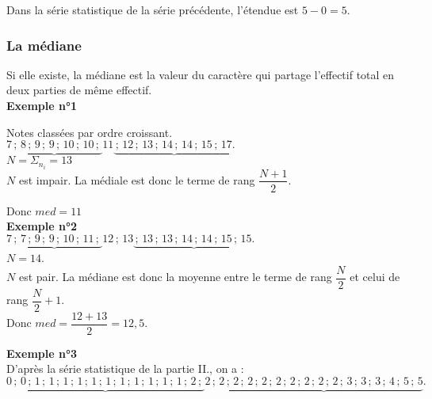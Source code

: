 Dans la série statistique de la série précédente, l'étendue est $5 - 0 = 5$.

\subsubsection{La médiane}

Si elle existe, la médiane est la valeur du caractère qui partage l'effectif total en deux parties de même effectif. \\

\textbf{Exemple n°1}

Notes classées par ordre croissant. \\

$ \underbrace{ 7 \, ; \,  8 \, ; \,  9 \, ; \,  9 \, ; \,  10 \, ; \,  10 \, ; \, } 11 \underbrace{\, ; \,  12 \, ; \,  13 \, ; \,  14 \, ; \,  14 \, ; \,  15 \, ; \,  17.} $ \\

$ N = \Sigma_{n_i} = 13$ \\

$N$ est impair. La médiale est donc le terme de rang $\dfrac{N+1}{2}$. 

Donc $med = 11$ \\

\textbf{Exemple n°2} \\

$ \underbrace{7 \, ; \,  7 \, ; \,  9 \, ; \,  9 \, ; \,  10 \, ; \,  11 \, ; \, } 12 \, ; \,  13 \underbrace{\, ; \,  13 \, ; \,  13 \, ; \,  14 \, ; \,  14 \, ; \,  15 \, ; \,  15.}$ \\

$ N = 14 $. \\

$N$ est pair. La médiane est donc la moyenne entre le terme de rang $\dfrac{N}{2}$ et celui de rang $\dfrac{N}{2} + 1$. \\
Donc $med = \dfrac{12 + 13}{2} = 12,5 $. 

\newpage 

\textbf{Exemple n°3} \\

D'après la série statistique de la partie II., on a : \\

$ \underbrace{0 \, ; \,  0 \, ; \,  1 \, ; \,  1 \, ; \,  1 \, ; \,  1 \, ; \,  1 \, ; \,  1 \, ; \,  1 \, ; \,  1 \, ; \,  1 \, ; \,  1 \, ; \,  1 \, ; \,  2 \, ; \, } 2 \, ; \,  2 \underbrace{\, ; \,  2 \, ; \,  2 \, ; \,  2 \, ; \,  2 \, ; \,  2 \, ; \,  2 \, ; \,  2 \, ; \,  2 \, ; \,  3 \, ; \,  3 \, ; \,  3 \, ; \,  4 \, ; \,  5 \, ; \,  5}.$ \\

